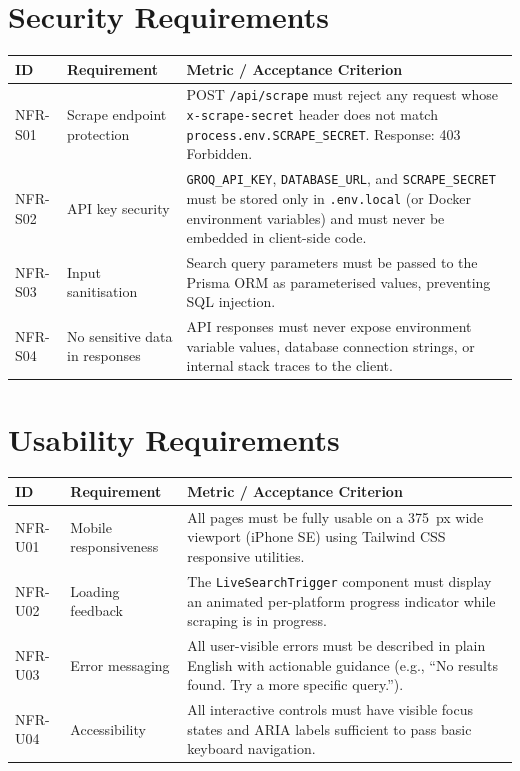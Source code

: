 \documentclass[12pt,a4paper]{report}
\begin{document}
\section{Security Requirements}

\begin{longtable}{L{2cm} L{4cm} L{7cm}}
  \toprule
  \textbf{ID} & \textbf{Requirement} & \textbf{Metric / Acceptance Criterion} \\
  \midrule
  \endhead
  NFR-S01 & Scrape endpoint protection &
    POST \texttt{/api/scrape} must reject any request whose
    \texttt{x-scrape-secret} header does not match
    \texttt{process.env.SCRAPE\_SECRET}. Response: 403 Forbidden. \\[3pt]
  NFR-S02 & API key security &
    \texttt{GROQ\_API\_KEY}, \texttt{DATABASE\_URL}, and \texttt{SCRAPE\_SECRET}
    must be stored only in \texttt{.env.local} (or Docker environment variables)
    and must never be embedded in client-side code. \\[3pt]
  NFR-S03 & Input sanitisation &
    Search query parameters must be passed to the Prisma ORM as parameterised
    values, preventing SQL injection. \\[3pt]
  NFR-S04 & No sensitive data in responses &
    API responses must never expose environment variable values,
    database connection strings, or internal stack traces to the client. \\
  \bottomrule
\end{longtable}

\section{Usability Requirements}

\begin{longtable}{L{2cm} L{4cm} L{7cm}}
  \toprule
  \textbf{ID} & \textbf{Requirement} & \textbf{Metric / Acceptance Criterion} \\
  \midrule
  \endhead
  NFR-U01 & Mobile responsiveness &
    All pages must be fully usable on a 375~px wide viewport (iPhone SE)
    using Tailwind CSS responsive utilities. \\[3pt]
  NFR-U02 & Loading feedback &
    The \texttt{LiveSearchTrigger} component must display an animated
    per-platform progress indicator while scraping is in progress. \\[3pt]
  NFR-U03 & Error messaging &
    All user-visible errors must be described in plain English with actionable
    guidance (e.g., ``No results found. Try a more specific query.''). \\[3pt]
  NFR-U04 & Accessibility &
    All interactive controls must have visible focus states and ARIA labels
    sufficient to pass basic keyboard navigation. \\
  \bottomrule
\end{longtable}
\end{document}
